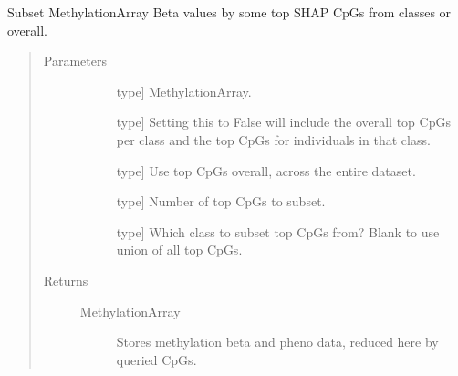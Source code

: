 \documentclass[letterpaper,10pt,english]{sphinxmanual}
\begin{document}
\begin{fulllineitems}
\begin{fulllineitems}
\label{\detokenize{index:methylnet.interpretation_classes.ShapleyDataExplorer.extract_methylation_array}}
Subset MethylationArray Beta values by some top SHAP CpGs from classes or overall.
\begin{quote}\begin{description}
\item[{Parameters}] \leavevmode\begin{description}
\item[{}] \leavevmode{[}type{]}
MethylationArray.

\item[{}] \leavevmode{[}type{]}
Setting this to False will include the overall top CpGs per class and the top CpGs for individuals in that class.

\item[{}] \leavevmode{[}type{]}
Use top CpGs overall, across the entire dataset.

\item[{}] \leavevmode{[}type{]}
Number of top CpGs to subset.

\item[{}] \leavevmode{[}type{]}
Which class to subset top CpGs from? Blank to use union of all top CpGs.

\end{description}

\item[{Returns}] \leavevmode\begin{description}
\item[{MethylationArray}] \leavevmode
Stores methylation beta and pheno data, reduced here by queried CpGs.

\end{description}

\end{description}\end{quote}

\end{fulllineitems}



\end{fulllineitems}
\end{document}
